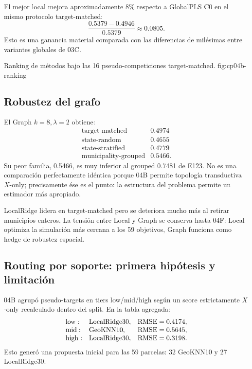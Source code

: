 El mejor local mejora aproximadamente 8\% respecto a GlobalPLS C0 en el mismo protocolo
target-matched:
\[
\frac{0.5379-0.4946}{0.5379}\approx0.0805.
\]
Esto es una ganancia material comparada con las diferencias de milésimas entre variantes
globales de 03C.

{Ranking de métodos bajo las 16 pseudo-competiciones target-matched.}
{fig:cp04b-ranking}

\subsection{Robustez del grafo}

El Graph $k=8,\lambda=2$ obtiene:
\[
\begin{array}{lr}
\text{target-matched} & 0.4974\\
\text{state-random} & 0.4655\\
\text{state-stratified} & 0.4779\\
\text{municipality-grouped} & 0.5466.
\end{array}
\]
Su peor familia, 0.5466, es muy inferior al grouped 0.7481 de E123. No es una comparación
perfectamente idéntica porque 04B permite topología transductiva $X$-only; precisamente ése es
el punto: la estructura del problema permite un estimador más apropiado.

LocalRidge lidera en target-matched pero se deteriora mucho más al retirar municipios enteros.
La tensión entre Local y Graph se conserva hasta 04F: Local optimiza la simulación más cercana
a los 59 objetivos, Graph funciona como hedge de robustez espacial.

\subsection{Routing por soporte: primera hipótesis y limitación}

04B agrupó pseudo-targets en tiers low/mid/high según un score estrictamente $X$-only
recalculado dentro del split. En la tabla agregada:
\[
\begin{array}{lll}
\text{low}: & \text{LocalRidge30}, & \operatorname{RMSE}=0.4174,\\
\text{mid}: & \text{GeoKNN10}, & \operatorname{RMSE}=0.5645,\\
\text{high}: & \text{LocalRidge30}, & \operatorname{RMSE}=0.3198.
\end{array}
\]
Esto generó una propuesta inicial para las 59 parcelas: 32 GeoKNN10 y 27 LocalRidge30.

